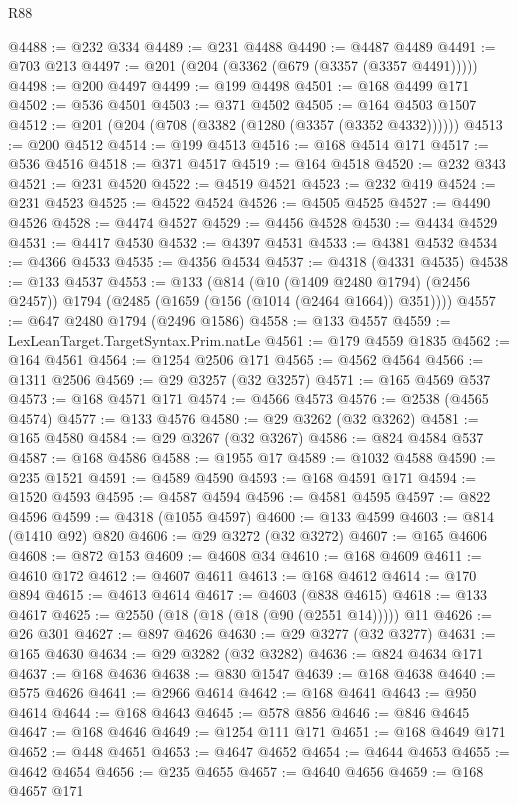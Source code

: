 \begin{lexlean}{R88}
\begin{coremodule}
@4488 := @232 @334
@4489 := @231 @4488
@4490 := @4487 @4489
@4491 := @703 @213
@4497 := @201 (@204 (@3362 (@679 (@3357 (@3357 @4491)))))
@4498 := @200 @4497
@4499 := @199 @4498
@4501 := @168 @4499 @171
@4502 := @536 @4501
@4503 := @371 @4502
@4505 := @164 @4503 @1507
@4512 := @201 (@204 (@708 (@3382 (@1280 (@3357 (@3352 @4332))))))
@4513 := @200 @4512
@4514 := @199 @4513
@4516 := @168 @4514 @171
@4517 := @536 @4516
@4518 := @371 @4517
@4519 := @164 @4518
@4520 := @232 @343
@4521 := @231 @4520
@4522 := @4519 @4521
@4523 := @232 @419
@4524 := @231 @4523
@4525 := @4522 @4524
@4526 := @4505 @4525
@4527 := @4490 @4526
@4528 := @4474 @4527
@4529 := @4456 @4528
@4530 := @4434 @4529
@4531 := @4417 @4530
@4532 := @4397 @4531
@4533 := @4381 @4532
@4534 := @4366 @4533
@4535 := @4356 @4534
@4537 := @4318 (@4331 @4535)
@4538 := @133 @4537
@4553 := @133
    (@814
      (@10 (@1409 @2480 @1794) (@2456 @2457))
      @1794
      (@2485 (@1659 (@156 (@1014 (@2464 @1664)) @351))))
@4557 := @647 @2480 @1794 (@2496 @1586)
@4558 := @133 @4557
@4559 := LexLeanTarget.TargetSyntax.Prim.natLe
@4561 := @179 @4559 @1835
@4562 := @164 @4561
@4564 := @1254 @2506 @171
@4565 := @4562 @4564
@4566 := @1311 @2506
@4569 := @29 @3257 (@32 @3257)
@4571 := @165 @4569 @537
@4573 := @168 @4571 @171
@4574 := @4566 @4573
@4576 := @2538 (@4565 @4574)
@4577 := @133 @4576
@4580 := @29 @3262 (@32 @3262)
@4581 := @165 @4580
@4584 := @29 @3267 (@32 @3267)
@4586 := @824 @4584 @537
@4587 := @168 @4586
@4588 := @1955 @17
@4589 := @1032 @4588
@4590 := @235 @1521
@4591 := @4589 @4590
@4593 := @168 @4591 @171
@4594 := @1520 @4593
@4595 := @4587 @4594
@4596 := @4581 @4595
@4597 := @822 @4596
@4599 := @4318 (@1055 @4597)
@4600 := @133 @4599
@4603 := @814 (@1410 @92) @820
@4606 := @29 @3272 (@32 @3272)
@4607 := @165 @4606
@4608 := @872 @153
@4609 := @4608 @34
@4610 := @168 @4609
@4611 := @4610 @172
@4612 := @4607 @4611
@4613 := @168 @4612
@4614 := @170 @894
@4615 := @4613 @4614
@4617 := @4603 (@838 @4615)
@4618 := @133 @4617
@4625 := @2550 (@18 (@18 (@18 (@90 (@2551 @14))))) @11
@4626 := @26 @301
@4627 := @897 @4626
@4630 := @29 @3277 (@32 @3277)
@4631 := @165 @4630
@4634 := @29 @3282 (@32 @3282)
@4636 := @824 @4634 @171
@4637 := @168 @4636
@4638 := @830 @1547
@4639 := @168 @4638
@4640 := @575 @4626
@4641 := @2966 @4614
@4642 := @168 @4641
@4643 := @950 @4614
@4644 := @168 @4643
@4645 := @578 @856
@4646 := @846 @4645
@4647 := @168 @4646
@4649 := @1254 @111 @171
@4651 := @168 @4649 @171
@4652 := @448 @4651
@4653 := @4647 @4652
@4654 := @4644 @4653
@4655 := @4642 @4654
@4656 := @235 @4655
@4657 := @4640 @4656
@4659 := @168 @4657 @171

\end{coremodule}
\end{lexlean}
